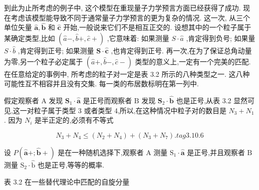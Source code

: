 到此为止所考虑的例子中, 这个模型在重现量子力学预言方面已经获得了成功. 现在考虑该模型能导致不同于通常量子力学预言的更为复杂的情况. 这一次, 从三个单位矢量 $\widehat{\mathbf{a}},\widehat{\mathbf{b}}$ 和 $\widehat{\mathbf{c}}$ 开始,一般说来它们不是相互正交的. 设想其中的一个粒子属于某确定类型,比如 $\left( {\widehat{a}-,\widehat{b} + ,\widehat{c} + }\right)$ ,它意味着: 如果测量 $S \cdot \widehat{a}$ ,肯定得到负号; 如果量 $S \cdot \widehat{b}$ ,肯定得到正号; 如果测量 $\mathbf{S} \cdot \widehat{\mathbf{c}}$ ,也肯定得到正号. 再一次,在为了保证总角动量为零,另一个粒子必定属于 $\left( {\widehat{a}+,\widehat{b}-,\widehat{c} - }\right)$ 类型的意义上,一定有一个完美的匹配. 在任意给定的事例中, 所考虑的粒子对一定是表 3.2 所示的八种类型之一. 这八种可能性互不相容并且没有交集. 每一类的布居数标明在第一列中.

假定观察者 $\mathrm{A}$ 发现 ${\mathbf{S}}_{1} \cdot \widehat{\mathbf{a}}$ 是正号而观察者 $\mathrm{B}$ 发现 ${\mathbf{S}}_{2} \cdot \widehat{\mathbf{b}}$ 也是正号,从表 3.2 显然可见,这一对粒子属于类型 3 或者类型 4,所以,在这种情况中粒子对的数目是 ${N}_{3} + {N}_{1}$ . 因为 ${N}_{i}$ 是半正定的,必须有不等式

$$
{N}_{3} + {N}_{4} \leq \left( {{N}_{2} + {N}_{4}}\right) + \left( {{N}_{3} + {N}_{7}}\right) . tag{3.10.6}
$$

设 $P\left( {\widehat{\mathbf{a}}+;\widehat{\mathbf{b}} + }\right)$ 是在一种随机选择下,观察者 $\mathrm{A}$ 测量 ${\mathrm{S}}_{1} \cdot \widehat{\mathbf{a}}$ 是正号,并且观察者 $\mathrm{B}$ 测量 ${\mathrm{S}}_{2} \cdot \widehat{\mathrm{b}}$ 也是正号,等等的概率.

表 3.2 在一些替代理论中匹配的自旋分量

